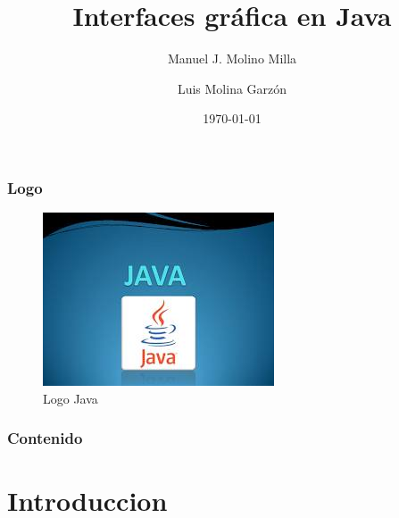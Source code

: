 \documentclass{beamer}
\title{Interfaces gráfica en Java}
\author{Manuel J. Molino Milla \and Luis Molina Garzón}
\date{\today} %
\institute{IES Virgen del Carmen \and Departamento de Informática}
\begin{document}
\begin{frame}
  \titlepage
\end{frame}

\begin{frame}
    \frametitle{Logo}
\begin{figure}
\includegraphics[scale=1]{imagenes/logo.jpeg} 
\caption{Logo Java}
\end{figure}
\end{frame}

\begin{frame}
  \frametitle{Contenido}
  \tableofcontents[pausesections]
\end{frame}



\section{Introduccion}
\end{document}
